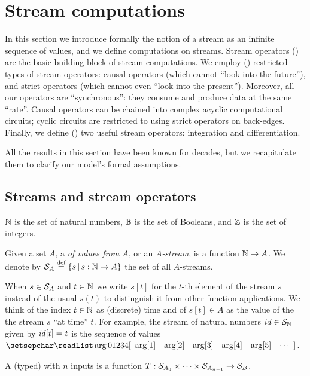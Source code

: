\section{Stream computations}\label{sec:streams}

In this section we introduce formally the notion of a stream as an
infinite sequence of values, and we define computations on streams.
Stream operators () are the basic building block of stream computations.  
We employ () restricted types of stream operators: causal operators (which cannot 
``look into the future''), and strict operators (which cannot even ``look into the present'').
Moreover, all our operators are ``synchronous'': they consume and produce data at the same ``rate''. Causal operators can be chained
into complex acyclic computational circuits; cyclic circuits are restricted to using strict operators 
on back-edges.  Finally, we define () two useful stream operators: integration and differentiation.

All the results in this section have been known for decades, 
but we recapitulate them to clarify our model's formal assumptions.

\subsection{Streams and stream operators}\label{sec:notation}

$\mathbb{N}$ is the set of natural numbers, $\mathbb{B}$ is the set of Booleans, and $\mathbb{Z}$ is the set of integers.

\begin{definition}[stream]
Given a set $A$, a  \emph{of values from $A$}, or an \emph{$A$-stream}, is a function $\mathbb{N} \rightarrow A$. 
We denote by $\mathcal{S}_{A} \stackrel{\textrm{\scriptsize def}}{=} \{ s \,|\, s : \mathbb{N} \to A \}$ the set of all $A$-streams. 
\end{definition}

When $s\in\mathcal{S}_{A}$ and $t\in\mathbb{N}$ we 
write $s[t]$ for the $t$-th element of the stream $s$ instead of the usual $s(t)$
to distinguish it from other function applications.
We think of the index $t\in\mathbb{N}$ as (discrete) time and of $s[t]\in A$ 
as the value of the the stream $s$ ``at time'' $t$.
\ifstreamexamples
For example, the stream of natural numbers $id \in \mathcal{S}_{\mathbb{N}}$ given by $\mathit{id}[t] = t$ is the sequence of values
$\sv{0 1 2 3 4}$.
\fi

\begin{definition}
A (typed)  with $n$ inputs is a function $T:\mathcal{S}_{A_0}\times\cdots\times\mathcal{S}_{A_{n-1}}\to\mathcal{S}_{B}$. 
\end{definition}

